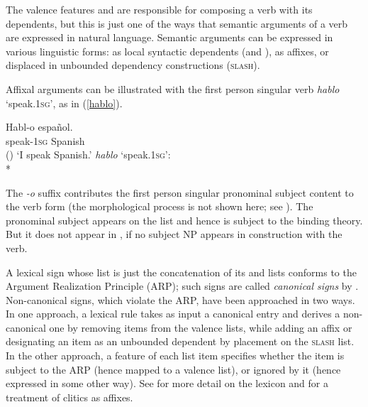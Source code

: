 \documentclass[output=paper,biblatex,babelshorthands,newtxmath,draftmode,colorlinks, citecolor=brown]{langscibook}
\begin{document}
The valence features \subj and \comps are responsible for composing a verb with its dependents, but
this is just one of the ways that semantic arguments of a verb are expressed in natural language.
Semantic arguments can be expressed in various linguistic forms: as local syntactic dependents
(\subj and \comps), as affixes, or displaced in unbounded dependency constructions (\textsc{slash}).

Affixal arguments can be illustrated with the first person singular  verb
\textit{hablo} `speak.\textsc{1sg}', as in (\ref{hablo}).


\begin{exe} 
\ex	
\label{hablo}
\begin{xlist}
\ex
\gll Habl-o espa\~{n}ol.  \\
     speak-\textsc{1sg} Spanish  \\\hfill()
\glt `I speak Spanish.'
\ex \textit{hablo} `speak.\textsc{1sg}': \\*
\end{xlist}
\end{exe}

\noindent
The \textit{-o} suffix contributes the first person singular pronominal subject content to the verb
form (the morphological process is not shown here; see ).  The
pronominal subject appears on the \argst list and hence is subject to the binding theory.  But it
does not appear in \subj, if no subject NP appears in construction with the verb.

A lexical sign whose \argst list is just the concatenation of its \subj{} and \comps{} lists conforms to
the Argument Realization Principle (ARP); such signs are called
\emph{canonical signs} by \citet{Boumaetal2001}.  Non-canonical signs, which
violate the ARP, have been approached in two ways.  In one approach, a lexical rule takes as input a
canonical entry and derives a non-canonical one by removing items from the valence lists, while
adding an affix or designating an item as an unbounded dependent by placement on the \textsc{slash}
list. In the other
approach, a feature of each \argst list item specifies whether the item is subject to the ARP (hence
mapped to a valence list), or ignored by it (hence expressed in some other way).  See
   for more detail on the lexicon and \citet{MillerandSag1997} for a
  treatment of  clitics as affixes.
\end{document}

